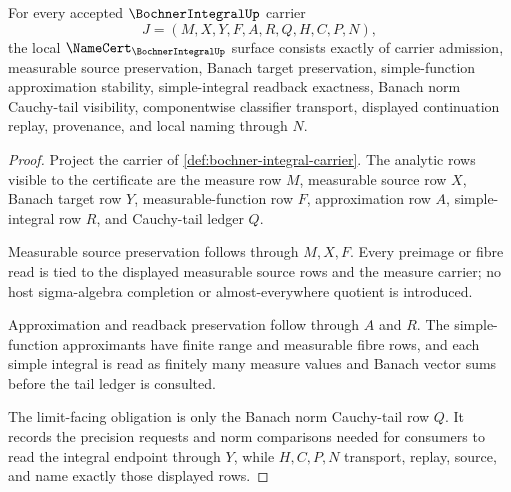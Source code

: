 \begin{theorem}
\label{thm:bochner-integral-namecert-obligations}
For every accepted $\BochnerIntegralUp$ carrier
$$
J=(M,X,Y,F,A,R,Q,H,C,P,N),
$$
the local $\NameCert_{\BochnerIntegralUp}$ surface consists exactly of carrier admission, measurable source preservation, Banach target preservation, simple-function approximation stability, simple-integral readback exactness, Banach norm Cauchy-tail visibility, componentwise classifier transport, displayed continuation replay, provenance, and local naming through $N$.
\end{theorem}
\begin{proof}
Project the carrier of \autoref{def:bochner-integral-carrier}. The analytic rows visible to the certificate are the measure row $M$, measurable source row $X$, Banach target row $Y$, measurable-function row $F$, approximation row $A$, simple-integral row $R$, and Cauchy-tail ledger $Q$.

Measurable source preservation follows through $M,X,F$. Every preimage or fibre read is tied to the displayed measurable source rows and the measure carrier; no host sigma-algebra completion or almost-everywhere quotient is introduced.

Approximation and readback preservation follow through $A$ and $R$. The simple-function approximants have finite range and measurable fibre rows, and each simple integral is read as finitely many measure values and Banach vector sums before the tail ledger is consulted.

The limit-facing obligation is only the Banach norm Cauchy-tail row $Q$. It records the precision requests and norm comparisons needed for consumers to read the integral endpoint through $Y$, while $H,C,P,N$ transport, replay, source, and name exactly those displayed rows.
\end{proof}

